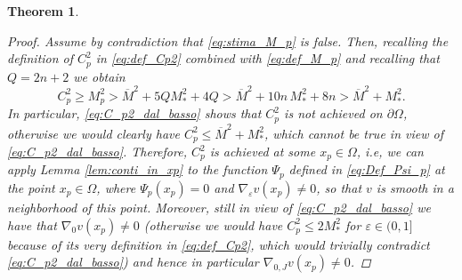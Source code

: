 \documentclass[10pt]{amsart}
\numberwithin{equation}{section}
\newtheorem{theorem}{Theorem}[section]
\theoremstyle{definition}
\newcommand{\eps}{\varepsilon}
\newcommand{\egrad}{\nabla_{\eps}}
\begin{document}
\begin{theorem}
\begin{proof}
Assume by contradiction that \eqref{eq:stima_M_p} is false. Then, recalling the definition of $C^2_p$ in \eqref{eq:def_Cp2} combined with \eqref{eq:def_M_p} and recalling that $Q=2n+2$ we obtain
\begin{equation}\label{eq:C_p2_dal_basso}
C^2_{p} \geq M_{p}^2 > \overline{M}^{2} + 5QM_{\ast}^2 + 4Q > \overline{M}^{2} + 10 n \, M_{\ast}^2 + 8n > \overline{M}^{2} + M_{\ast}^2.
\end{equation}	
In particular, \eqref{eq:C_p2_dal_basso} shows that $C_p^2$ is not achieved on $\partial\Omega$, otherwise we would clearly have $C_p^2 \leq \overline{M}^2 + M_{\ast}^2$, which cannot be true in view of \eqref{eq:C_p2_dal_basso}. Therefore, $C^2_p$ is achieved at some $x_p \in \Omega$, i.e, we can apply Lemma \ref{lem:conti_in_xp} to the function $\Psi_p$ defined in \eqref{eq:Def_Psi_p} at the point $x_p \in \Omega$, where $\Psi_p(x_p)=0$ and $\egrad v (x_p)\neq 0$, so that $v$ is smooth in a neighborhood of this point. Moreover, still in view of \eqref{eq:C_p2_dal_basso} we have that $\nabla_{0}v(x_p)\neq 0$ (otherwise we would have $C_p^{2} \leq 2 M_{\ast}^2$ for $\varepsilon \in (0,1]$ because of its very definition in \eqref{eq:def_Cp2}, which would trivially contradict \eqref{eq:C_p2_dal_basso}) and hence in particular $\nabla_{0,J}v(x_p)\neq 0$.
		

\end{proof}
\end{theorem}
\end{document}
